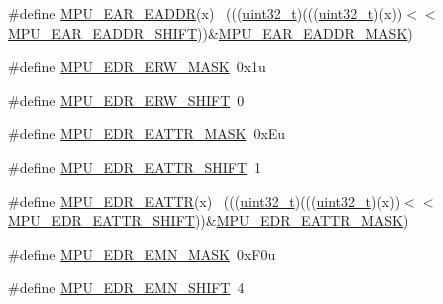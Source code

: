 \begin{DoxyCompactItemize}
\item 
\#define \hyperlink{group___m_p_u___register___masks_ga7815747123ac5e47bae56092e96eb1df}{M\+P\+U\+\_\+\+E\+A\+R\+\_\+\+E\+A\+D\+DR}(x)                                              ~(((\hyperlink{_p_e___types_8h_a33594304e786b158f3fb30289278f5af}{uint32\+\_\+t})(((\hyperlink{_p_e___types_8h_a33594304e786b158f3fb30289278f5af}{uint32\+\_\+t})(x))$<$$<$\hyperlink{group___m_p_u___register___masks_ga2bbd867e08b8ad2b609ab33a558e501c}{M\+P\+U\+\_\+\+E\+A\+R\+\_\+\+E\+A\+D\+D\+R\+\_\+\+S\+H\+I\+FT}))\&\hyperlink{group___m_p_u___register___masks_ga2fec46c3866c88337f8ee0639c8d81b5}{M\+P\+U\+\_\+\+E\+A\+R\+\_\+\+E\+A\+D\+D\+R\+\_\+\+M\+A\+SK})
\item 
\#define \hyperlink{group___m_p_u___register___masks_ga469d59f7f1a51f8d7041b2404a246fb6}{M\+P\+U\+\_\+\+E\+D\+R\+\_\+\+E\+R\+W\+\_\+\+M\+A\+SK}~0x1u
\item 
\#define \hyperlink{group___m_p_u___register___masks_ga927ea9ae9756926304a7199714ee646a}{M\+P\+U\+\_\+\+E\+D\+R\+\_\+\+E\+R\+W\+\_\+\+S\+H\+I\+FT}~0
\item 
\#define \hyperlink{group___m_p_u___register___masks_ga92ec1bda4da654cec287d9c1bfadd4e7}{M\+P\+U\+\_\+\+E\+D\+R\+\_\+\+E\+A\+T\+T\+R\+\_\+\+M\+A\+SK}~0x\+Eu
\item 
\#define \hyperlink{group___m_p_u___register___masks_gac76941d0d78453dcab7b06fc204a1abb}{M\+P\+U\+\_\+\+E\+D\+R\+\_\+\+E\+A\+T\+T\+R\+\_\+\+S\+H\+I\+FT}~1
\item 
\#define \hyperlink{group___m_p_u___register___masks_ga0f229cd86e20adbcced8b6a914bedd8a}{M\+P\+U\+\_\+\+E\+D\+R\+\_\+\+E\+A\+T\+TR}(x)                                              ~(((\hyperlink{_p_e___types_8h_a33594304e786b158f3fb30289278f5af}{uint32\+\_\+t})(((\hyperlink{_p_e___types_8h_a33594304e786b158f3fb30289278f5af}{uint32\+\_\+t})(x))$<$$<$\hyperlink{group___m_p_u___register___masks_gac76941d0d78453dcab7b06fc204a1abb}{M\+P\+U\+\_\+\+E\+D\+R\+\_\+\+E\+A\+T\+T\+R\+\_\+\+S\+H\+I\+FT}))\&\hyperlink{group___m_p_u___register___masks_ga92ec1bda4da654cec287d9c1bfadd4e7}{M\+P\+U\+\_\+\+E\+D\+R\+\_\+\+E\+A\+T\+T\+R\+\_\+\+M\+A\+SK})
\item 
\#define \hyperlink{group___m_p_u___register___masks_ga57901086814557690f671d195d886423}{M\+P\+U\+\_\+\+E\+D\+R\+\_\+\+E\+M\+N\+\_\+\+M\+A\+SK}~0x\+F0u
\item 
\#define \hyperlink{group___m_p_u___register___masks_gad27c9ef1ae37201a6c16976311c5e1b3}{M\+P\+U\+\_\+\+E\+D\+R\+\_\+\+E\+M\+N\+\_\+\+S\+H\+I\+FT}~4
\item 

\end{DoxyCompactItemize}
